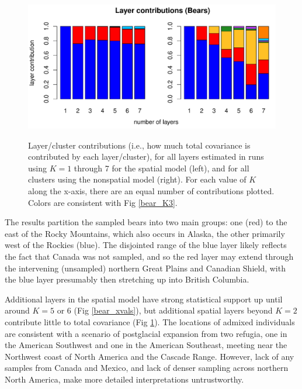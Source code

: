 \documentclass[10pt,letterpaper]{article}
\begin{document}
\begin{figure}
	\centering
		{\includegraphics[width=\textwidth]{figs/bears/bears_laycon_barplots.pdf}}
	\caption{
	Layer/cluster contributions (i.e., how much total covariance is contributed by each layer/cluster), 
	for all layers estimated in runs using $K = 1$ through 7 
	for the spatial model (left),
	and for all clusters using the nonspatial model (right).
	For each value of $K$ along the x-axis, there are an equal number of contributions plotted.
	Colors are consistent with Fig \ref{bear_K3}.
    }\label{bear_laycon}
\end{figure}

The results partition the sampled bears into two main groups:
one (red) to the east of the Rocky Mountains, 
which also occurs in Alaska,
the other primarily west of the Rockies (blue).
The disjointed range of the blue layer likely reflects the fact
that Canada was not sampled, 
and so the red layer may extend
through the intervening (unsampled) northern Great Plains and Canadian Shield, 
with the blue layer presumably then stretching up into British Columbia.

Additional layers in the spatial model have strong statistical support 
up until around $K=5$ or 6 (Fig \ref{bear_xvals}),
but additional spatial layers beyond $K=2$ contribute little to total covariance (Fig \ref{bear_laycon}).
The locations of admixed individuals 
are consistent with a scenario of postglacial expansion from two refugia, 
one in the American Southwest and one in the American Southeast, 
meeting near the Northwest coast of North America and the Cascade Range.
However, lack of any samples from Canada and Mexico, 
and lack of denser sampling across northern North America, 
make more detailed interpretations untrustworthy.
\end{document}
